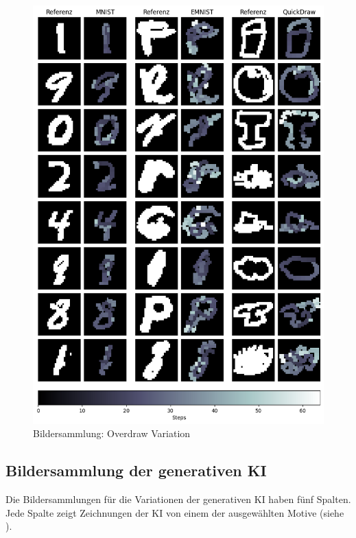 \begin{figure}[!ht]
    \centering
    \includegraphics[width=\textwidth]{images/resultate/overdraw.png}
    \caption{Bildersammlung: Overdraw Variation}\label{fig:r-overdraw}
\end{figure}



\subsection{Bildersammlung der generativen KI}\label{sub:r_bild_gen}

Die Bildersammlungen für die Variationen der generativen KI haben fünf Spalten. Jede
Spalte zeigt Zeichnungen der KI von einem der ausgewählten Motive (siehe
).
